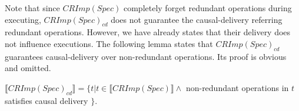 {\color {red}Note that since $CRImp(Spec)$ completely forget redundant operations during executing, $CRImp(Spec)_{\mathit{cd}}$ does not guarantee the causal-delivery referring redundant operations. However, we have already states that their delivery does not influence executions.} The following lemma states that $CRImp(Spec)_{\mathit{cd}}$ guarantees causal-delivery over non-redundant operations. Its proof is obvious and omitted.

\begin{lemma}
\label{lemma:CRImpcdSpec guarantees causal delivery for non-redundant operations}
$\llbracket CRImp(Spec)_{cd} \rrbracket = \{ t \vert t \in \llbracket CRImp(Spec) \rrbracket \wedge $ non-redundant operations in $t$ satisfies causal delivery $\}$.
\end{lemma}
























